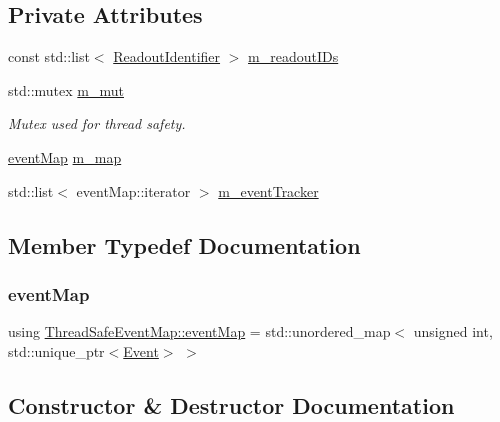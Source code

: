 \subsection*{Private Attributes}
\begin{DoxyCompactItemize}
\item 
const std\+::list$<$ \hyperlink{class_readout_identifier}{Readout\+Identifier} $>$ \hyperlink{class_thread_safe_event_map_a1b1ff8e56effaac464b1c9dbfb44320c}{m\+\_\+readout\+I\+Ds}
\item 
std\+::mutex \hyperlink{class_thread_safe_event_map_ada4e8c2f2195df86503e73674ff30935}{m\+\_\+mut}
\begin{DoxyCompactList}\small\item\em Mutex used for thread safety. \end{DoxyCompactList}\item 
\hyperlink{class_thread_safe_event_map_a069c80cec7636a015d8a69574157d8d2}{event\+Map} \hyperlink{class_thread_safe_event_map_a15d9d8928ff7dc51fa48a1829575b47e}{m\+\_\+map}
\item 
std\+::list$<$ event\+Map\+::iterator $>$ \hyperlink{class_thread_safe_event_map_abfd8bf29e9ff254df217bd2b9e32f50c}{m\+\_\+event\+Tracker}
\end{DoxyCompactItemize}


\subsection{Member Typedef Documentation}
\mbox{\label{class_thread_safe_event_map_a069c80cec7636a015d8a69574157d8d2}} 
\subsubsection{\texorpdfstring{event\+Map}{eventMap}}
{\footnotesize\ttfamily using \hyperlink{class_thread_safe_event_map_a069c80cec7636a015d8a69574157d8d2}{Thread\+Safe\+Event\+Map\+::event\+Map} =  std\+::unordered\+\_\+map$<$ unsigned int, std\+::unique\+\_\+ptr$<$\hyperlink{class_event}{Event}$>$ $>$\hspace{0.3cm}{\ttfamily [private]}}



\subsection{Constructor \& Destructor Documentation}
\mbox{\label{class_thread_safe_event_map_a766a347019971b1697e7e223290364b4}} 
